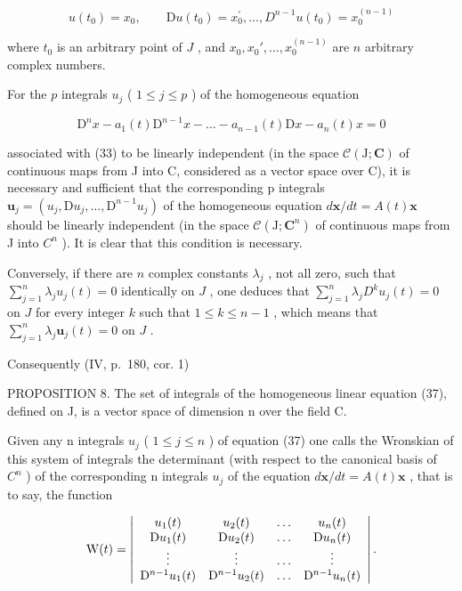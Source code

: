 \[
u (t _ {0}) = x _ {0}, \qquad \mathrm{D} u (t _ {0}) = x _ {0} ^ {\prime}, \dots , D ^ {n - 1} u (t _ {0}) = x _ {0} ^ {(n - 1)}\tag{36}
\]

where \(t_0\) is an arbitrary point of \(J\) , and \(x_0, x_0', \ldots, x_0^{(n-1)}\) are \(n\) arbitrary complex numbers.

For the \(p\) integrals \(u_{j}\) ( \(1 \leqslant j \leqslant p\) ) of the homogeneous equation

\[
\mathrm{D} ^ {n} x - a _ {1} (t) \mathrm{D} ^ {n - 1} x - \dots - a _ {n - 1} (t) \mathrm{D} x - a _ {n} (t) x = 0\tag{37}
\]

associated with (33) to be linearly independent (in the space \(\mathcal{C}(\mathrm{J};\mathbf{C})\) of continuous maps from J into C, considered as a vector space over C), it is necessary and sufficient that the corresponding p integrals \(\mathbf{u}_{j}=(u_{j},\mathrm{D}u_{j},\ldots,\mathrm{D}^{n-1}u_{j})\) of the homogeneous equation \(d\mathbf{x}/dt=A(t)\mathbf{x}\) should be linearly independent (in the space \(\mathcal{C}(\mathrm{J};\mathbf{C}^{n})\) of continuous maps from J into \(C^{n}\) ). It is clear that this condition is necessary.

Conversely, if there are \(n\) complex constants \(\lambda_j\) , not all zero, such that \(\sum_{j=1}^{n} \lambda_j u_j(t) = 0\) identically on \(J\) , one deduces that \(\sum_{j=1}^{n} \lambda_j D^k u_j(t) = 0\) on \(J\) for every integer \(k\) such that \(1 \leqslant k \leqslant n - 1\) , which means that \(\sum_{j=1}^{n} \lambda_j \mathbf{u}_j(t) = 0\) on \(J\) .

Consequently (IV, p.~180, cor. 1)

PROPOSITION 8. The set of integrals of the homogeneous linear equation (37), defined on J, is a vector space of dimension n over the field C.

Given any n integrals \(u_{j}\) ( \(1 \leqslant j \leqslant n\) ) of equation (37) one calls the Wronskian of this system of integrals the determinant (with respect to the canonical basis of \(C^{n}\) ) of the corresponding n integrals \(u_{j}\) of the equation \(d\mathbf{x}/dt = A(t)\mathbf{x}\) , that is to say, the function

\[
\mathrm{W} (t) = \left| \begin{array}{c c c c} u _ {1} (t) & u _ {2} (t) & \ldots & u _ {n} (t) \\ \mathrm{D} u _ {1} (t) & \mathrm{D} u _ {2} (t) & \ldots & \mathrm{D} u _ {n} (t) \\ \vdots & \vdots & \ldots & \vdots \\ \mathrm{D} ^ {n - 1} u _ {1} (t) & \mathrm{D} ^ {n - 1} u _ {2} (t) & \ldots & \mathrm{D} ^ {n - 1} u _ {n} (t) \end{array} \right|.
\]

